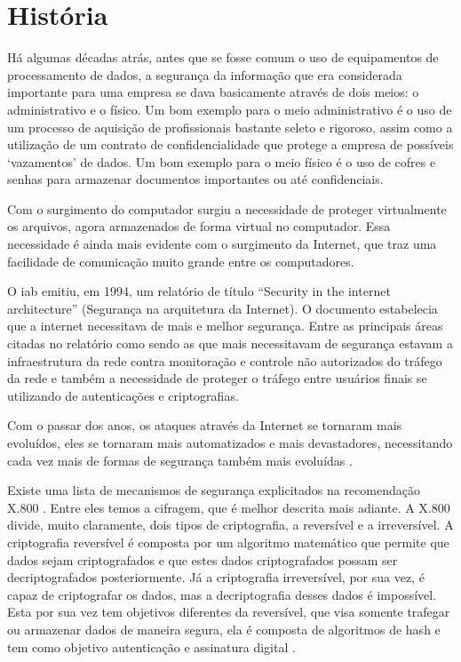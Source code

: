 \section{História}
\label{sec:historia}
Há algumas décadas atrás, antes que se fosse comum o uso de equipamentos de processamento de dados, a segurança da informação que era considerada importante para uma empresa se dava basicamente através de dois meios: o administrativo e o físico. Um bom exemplo para o meio administrativo é o uso de um processo de aquisição de profissionais bastante seleto e rigoroso, assim como a utilização de um contrato de confidencialidade que protege a empresa de possíveis ‘vazamentos’ de dados. Um bom exemplo para o meio físico é o uso de cofres e senhas para armazenar documentos importantes ou até confidenciais.

Com o surgimento do computador surgiu a necessidade de proteger virtualmente os arquivos, agora armazenados de forma virtual no computador. Essa necessidade é ainda mais evidente com o surgimento da Internet, que traz uma facilidade de comunicação muito grande entre os computadores.

O \acrfull{iab} emitiu, em 1994, um relatório de título “Security in the internet architecture” (Segurança na arquitetura da Internet). O documento estabelecia que a internet necessitava de mais e melhor segurança. Entre as principais áreas citadas no relatório como sendo as que mais necessitavam de segurança estavam a infraestrutura da rede contra monitoração e controle não autorizados do tráfego da rede e também a necessidade de proteger o tráfego entre usuários finais se utilizando de autenticações e criptografias.

Com o passar dos anos, os ataques através da Internet se tornaram mais evoluídos, eles se tornaram mais automatizados e mais devastadores, necessitando cada vez mais de formas de segurança também mais evoluídas \cite{stallings14}.

Existe uma lista de mecanismos de segurança explicitados na recomendação X.800 \cite{itu91}. Entre eles temos a cifragem, que é melhor descrita mais adiante. A X.800 divide, muito claramente, dois tipos de criptografia, a reversível e a irreversível. A criptografia reversível é composta por um algoritmo matemático que permite que dados sejam criptografados e que estes dados criptografados possam ser decriptografados posteriormente. Já a criptografia irreversível, por sua vez, é capaz de criptografar os dados, mas a decriptografia desses dados é impossível. Esta por sua vez tem objetivos diferentes da reversível, que visa somente trafegar ou armazenar dados de maneira segura, ela é composta de algoritmos de hash e tem como objetivo autenticação e assinatura digital \cite{stallings14} \cite{itu91}.

